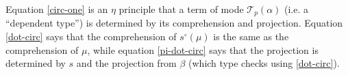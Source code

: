 \documentclass[10pt]{article}
\theoremstyle{definition}
\newtheorem{definition}{Definition}
\newcommand{\id}{\mathsf{id}}
\newcommand\El[2]{\mathcal{T}_{#1}(#2)}
\newcommand\bdot[0]{\mathbin{.}}
\begin{document}
Equation \eqref{circ-one} is an $\eta$ principle that a term of mode
$\El{p}{\alpha}$ (i.e. a ``dependent type'') is determined by its
comprehension and projection. Equation \eqref{dot-circ} says
that the comprehension of $s^\circ(\mu)$ is the same as the
comprehension of $\mu$, while equation \eqref{pi-dot-circ} says that the
projection is determined by $s$ and the projection from $\beta$ (which
type checks using \eqref{dot-circ}).

%
\end{document}
